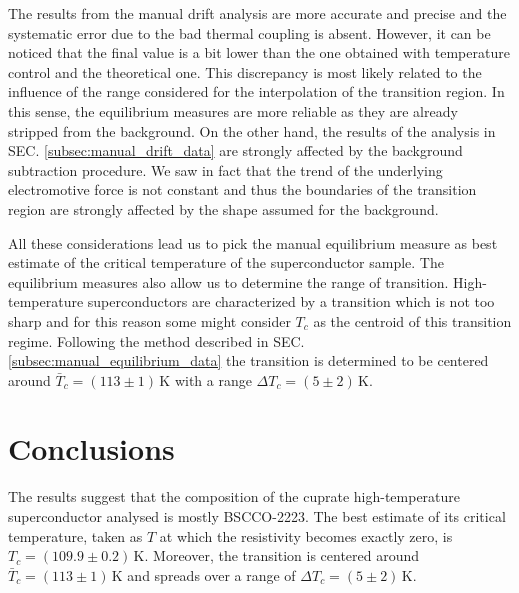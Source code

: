 \documentclass[rmp,10pt,onecolumn,fleqn,notitlepage]{revtex4-1}
\begin{document}
The results from the manual drift analysis are more accurate and precise and the systematic error due to the bad thermal coupling is absent. However, it can be noticed that the final value is a bit lower than the one obtained with temperature control and the theoretical one. This discrepancy is most likely related to the influence of the range considered for the interpolation of the transition region. In this sense, the equilibrium measures are more reliable as they are already stripped from the background.
On the other hand, the results of the analysis in SEC. \ref{subsec:manual_drift_data} are strongly affected by the background subtraction procedure. We saw in fact that the trend of the underlying electromotive force is not constant and thus the boundaries of the transition region are strongly affected by the shape assumed for the background.

All these considerations lead us to pick the manual equilibrium measure as best estimate of the critical temperature of the superconductor sample.
The equilibrium measures also allow us to determine the range of transition. High-temperature superconductors are characterized by a transition which is not too sharp and for this reason some might consider $T_c$ as the centroid of this transition regime. Following the method described in SEC. \ref{subsec:manual_equilibrium_data} the transition is determined to be centered around $\bar{T}_c = (113 \pm 1)\, \si{\kelvin}$ with a range $\Delta T_c = (5\pm 2)\, \si{\kelvin}$.

\section{Conclusions}
\label{sec:conclusions}
The results suggest that the composition of the cuprate high-temperature superconductor analysed is mostly BSCCO-2223. 
The best estimate of its critical temperature, taken as $T$ at which the resistivity becomes exactly zero, is $T_c = (109.9 \pm 0.2)\, \si{\kelvin}$.
Moreover, the transition is centered around $\bar{T}_c = (113 \pm 1)\, \si{\kelvin}$ and spreads over a range of $\Delta T_c = (5\pm 2)\, \si{\kelvin}$.

\clearpage



{}
\end{document}
